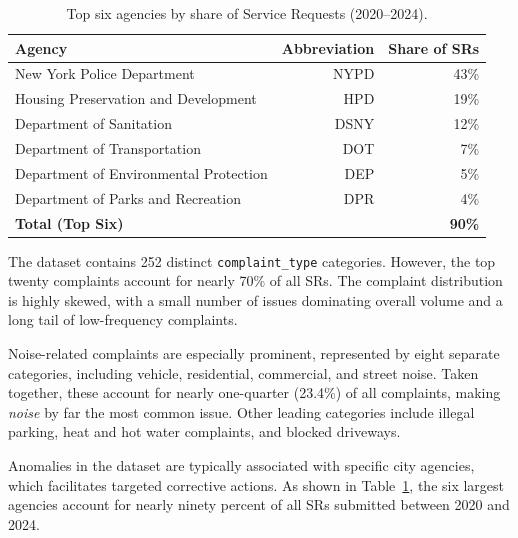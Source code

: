 \documentclass[linenumber]{jdsart}
\begin{document}
\begin{table}[tbp]
  \centering
  \caption{Top six agencies by share of Service Requests (2020--2024).}
  \label{tab:big-six-agencies}
  \begin{tabular}{lrr}
    \toprule
    \textbf{Agency} & \textbf{Abbreviation} & \textbf{Share of SRs} \\
    \midrule
    New York Police Department & NYPD & 43\% \\
    Housing Preservation and Development & HPD & 19\% \\
    Department of Sanitation & DSNY & 12\% \\
    Department of Transportation & DOT & 7\% \\
    Department of Environmental Protection & DEP & 5\% \\
    Department of Parks and Recreation & DPR & 4\% \\
    \midrule
    \textbf{Total (Top Six)} & & \textbf{90\%} \\
    \bottomrule
  \end{tabular}
\end{table}

The dataset contains 252 distinct \texttt{complaint\_type} categories.
However, the top twenty complaints 
account for nearly 70\% of all SRs. The complaint distribution is 
highly skewed, with a small number of issues dominating 
overall volume and a long tail of low-frequency complaints. 

Noise-related complaints are especially prominent, represented 
by eight separate categories, including vehicle, residential, commercial, 
and street noise. Taken together, these account for nearly 
one-quarter (23.4\%) of all complaints, making \emph{noise} by 
far the most common issue. Other leading categories 
include illegal parking, heat and hot water complaints, and blocked driveways.

Anomalies in the dataset are typically associated with specific city agencies, 
which facilitates targeted corrective actions. As shown in 
Table~\ref{tab:big-six-agencies}, the six largest agencies account for
nearly ninety percent of all SRs submitted between 2020 and 2024.


\end{document}
